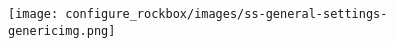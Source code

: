   \begin{center}
    \texttt{[image: configure\_rockbox/images/ss-general-settings-\\genericimg.png]}
  \end{center}

  
